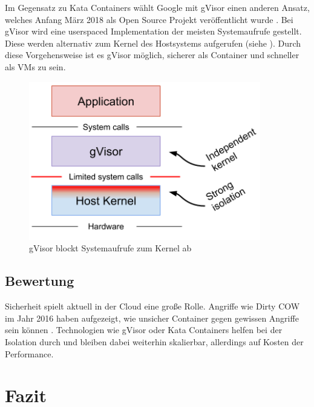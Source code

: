 Im Gegensatz zu Kata Containers wählt Google mit gVisor einen anderen Ansatz, welches Anfang März 2018 als Open Source Projekt veröffentlicht wurde \citep{OpenSourcingGVisoraSandboxedContainerRuntime}. Bei gVisor wird eine userspaced Implementation der meisten Systemaufrufe gestellt. Diese werden alternativ zum Kernel des Hostsystems aufgerufen (siehe ). Durch diese Vorgehensweise ist es gVisor möglich, sicherer als Container und schneller als VMs zu sein.

\begin{figure}
	\begin{center}
		\includegraphics[width=0.9\textwidth]{bilder/gVisor.png}
		\caption{gVisor blockt Systemaufrufe zum Kernel ab \citep{OpenSourcingGVisoraSandboxedContainerRuntime}}
		\label{fig:gVisor}		
	\end{center}
\end{figure}

\pagebreak
\subsection{Bewertung}
\label{sec:compVMbasedBewertung}
Sicherheit spielt aktuell in der Cloud eine große Rolle. Angriffe wie Dirty COW im Jahr 2016 haben aufgezeigt, wie unsicher Container gegen gewissen Angriffe sein können \citep{DirtyCOWCVE20165195}. Technologien wie gVisor oder Kata Containers helfen bei der Isolation durch und bleiben dabei weiterhin skalierbar, allerdings auf Kosten der Performance.

\section{Fazit}
\label{sec:compFazit}

